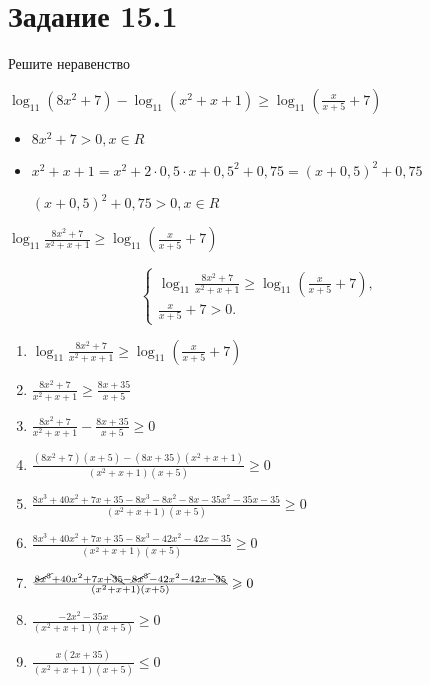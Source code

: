 \section*{Задание 15.1}

Решите неравенство

$\log_{11}\left(8x^2+7\right) -
    \log_{11}\left(x^2+x+1\right) \geqslant
    \log_{11}\left(\frac{x}{x+5}+7\right)$


\begin{itemize}
    \item $8x^2+7>0, x \in R$
    \item {
          $x^2+x+1 =
              x^2 + 2 \cdot 0,5 \cdot x + 0,5^2 + 0,75 =
              (x + 0,5)^2 + 0,75$

          $(x + 0,5)^2 + 0,75 > 0, x \in R$
          }
\end{itemize}

$\log_{11} \frac{8x^2+7}{x^2+x+1} \geqslant
    \log_{11} \left(\frac{x}{x+5} + 7\right)$

\begin{equation*}
    \begin{cases}
        \log_{11} \frac{8x^2+7}{x^2+x+1} \geqslant
        \log_{11} \left(\frac{x}{x+5} + 7\right), \\
        \frac{x}{x+5} + 7 > 0.
    \end{cases}
\end{equation*}

\begin{enumerate}[{$1$}.$1$]
    \item $\log_{11} \frac{8x^2+7}{x^2+x+1} \geqslant \log_{11} \left(\frac{x}{x+5} + 7\right)$
    \item $\frac{8x^2+7}{x^2+x+1} \geqslant \frac{8x+35}{x+5}$
    \item $\frac{8x^2+7}{x^2+x+1} - \frac{8x+35}{x+5} \geqslant 0$
    \item $\frac{(8x^2+7)(x+5) - (8x+35)(x^2+x+1)}{(x^2+x+1)(x+5)} \geqslant 0$
    \item $\frac{8x^3 + 40x^2 + 7x + 35 - 8x^3 - 8x^2 - 8x - 35x^2 - 35x - 35}{(x^2+x+1)(x+5)} \geqslant 0$
    \item $\frac{8x^3 + 40x^2 + 7x + 35 - 8x^3 - 42x^2 - 42x - 35}{(x^2+x+1)(x+5)} \geqslant 0$
    \item $\frac{\cancel{8x^3} + 40x^2 + 7x + \bcancel{35} - \cancel{8x^3} - 42x^2 - 42x - \bcancel{35}}{(x^2+x+1)(x+5)} \geqslant 0$
    \item $\frac{-2x^2-35x}{(x^2+x+1)(x+5)} \geqslant 0$
    \item $\frac{x(2x+35)}{(x^2+x+1)(x+5)} \leqslant 0$
\end{enumerate}


